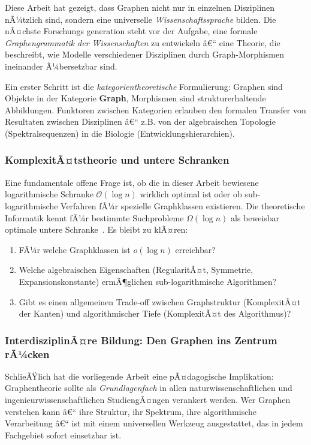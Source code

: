 ﻿\documentclass[12pt,a4paper,twoside]{article}
\theoremstyle{definition}
\theoremstyle{plain}
\theoremstyle{remark}
\begin{document}
Diese Arbeit hat gezeigt, dass Graphen nicht nur in
einzelnen Disziplinen nÃ¼tzlich sind, sondern eine universelle
\emph{Wissenschaftssprache} bilden.  Die nÃ¤chste Forschungs\-
generation steht vor der Aufgabe, eine formale
\emph{Graphengrammatik der Wissenschaften} zu entwickeln â€“
eine Theorie, die beschreibt, wie Modelle verschiedener
Disziplinen durch Graph-Morphismen~\cite{Ehrig2006}
ineinander Ã¼bersetzbar sind.

Ein erster Schritt ist die \emph{kategorientheoretische}
Formulierung: Graphen sind Objekte in der Kategorie
\textbf{Graph}, Morphismen sind strukturerhaltende
Abbildungen.  Funktoren zwischen Kategorien erlauben
den formalen Transfer von Resultaten zwischen Disziplinen â€“
z.B. von der algebraischen Topologie (Spektralsequenzen)
in die Biologie (Entwicklungshierarchien).

\subsubsection{KomplexitÃ¤tstheorie und untere Schranken}

Eine fundamentale offene Frage ist, ob die in dieser Arbeit
bewiesene logarithmische Schranke $\mathcal{O}(\log n)$
wirklich optimal ist oder ob sub-logarithmische Verfahren
fÃ¼r spezielle Graphklassen existieren.  Die theoretische
Informatik kennt fÃ¼r bestimmte Suchprobleme
$\Omega(\log n)$ als beweisbar optimale untere Schranke~\cite{Hromkovic2004}.
Es bleibt zu klÃ¤ren:
\begin{enumerate}
  \item FÃ¼r welche Graphklassen ist $o(\log n)$ erreichbar?
  \item Welche algebraischen Eigenschaften (RegularitÃ¤t,
        Symmetrie, Expansionskonstante) ermÃ¶glichen
        sub-logarithmische Algorithmen?
  \item Gibt es einen allgemeinen Trade-off zwischen
        Graphstruktur (KomplexitÃ¤t der Kanten) und
        algorithmischer Tiefe (KomplexitÃ¤t des Algorithmus)?
\end{enumerate}

\subsubsection{InterdisziplinÃ¤re Bildung: Den Graphen ins Zentrum rÃ¼cken}

SchlieÃŸlich hat die vorliegende Arbeit eine pÃ¤dagogische
Implikation: Graphentheorie sollte als \emph{Grundlagenfach}
in allen naturwissenschaftlichen und ingenieurwissenschaftlichen
StudiengÃ¤ngen verankert werden.  Wer Graphen verstehen kann â€“
ihre Struktur, ihr Spektrum, ihre algorithmische Verarbeitung â€“
ist mit einem universellen Werkzeug ausgestattet, das in
jedem Fachgebiet sofort einsetzbar ist.
\end{document}
